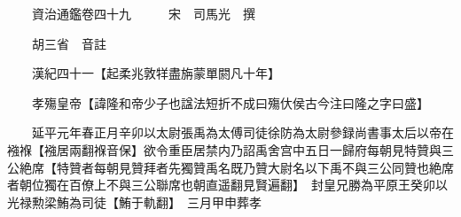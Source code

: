 










 


 
 


 

  
  
  
  
  





  
  
  
  
  
 
  

  

  
  
  



  

 
 

  
   




  

  
  


  　　資治通鑑卷四十九　　　宋　司馬光　撰

　　胡三省　音註

　　漢紀四十一【起柔兆敦䍧盡旃蒙單閼凡十年】

　　孝殤皇帝【諱隆和帝少子也諡法短折不成曰殤㐲侯古今注曰隆之字曰盛】

　　延平元年春正月辛卯以太尉張禹為太傅司徒徐防為太尉參録尚書事太后以帝在襁褓【襁居兩翻褓音保】欲令重臣居禁内乃詔禹舍宫中五日一歸府每朝見特贊與三公絶席【特贊者每朝見贊拜者先獨贊禹名既乃贊大尉名以下禹不與三公同贊也絶席者朝位獨在百僚上不與三公聯席也朝直遥翻見賢遍翻】　封皇兄勝為平原王癸卯以光禄勲梁鮪為司徒【鮪于軌翻】　三月甲申葬孝

